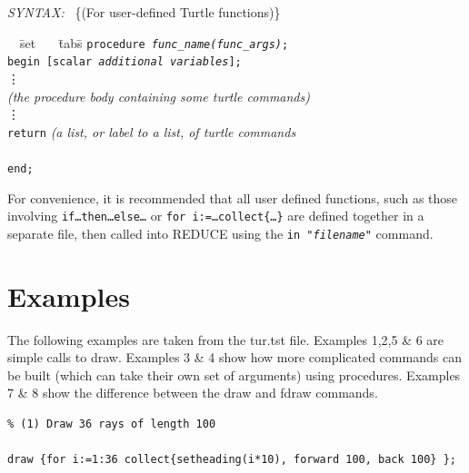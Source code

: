 \documentclass[11pt]{article}
\newcommand{\syntax}{\textsl{SYNTAX: }}
\begin{document}
\syntax\ \{\small {(For user-defined Turtle functions)}\} 
\begin{tabbing}
\ \ \= set \ \ \ \=tabs\=                                       \kill
 \> {\tt procedure {\it func\_name(func\_args)};}                  \\
 \> {\tt begin [scalar {\it additional variables}];}               \\   
 \> \> \vdots                                                      \\
 \> \> {\it (the procedure body containing some turtle commands)}  \\
 \> \> \vdots                                                      \\ 
 \> \> {\tt return} {\it (a list, or label to a list, of turtle commands}\\
 \> \>            \\
 \> {\tt end;} \\
\end{tabbing}

  For convenience, it is recommended that all user defined functions, such
as those involving {\tt if\ldots then\ldots else\ldots} or {\tt for
i:=\ldots collect\{\ldots\}} are defined together in a separate file, then
called into {\small REDUCE} using the {\tt in "{\it filename}"} command.

\newpage

\section{Examples}

The following examples are taken from the tur.tst file. 
Examples 1,2,5 \& 6 are simple calls to draw. Examples 3 \& 4 show how 
more complicated commands can be built (which can take their own set of
arguments) using procedures. Examples 7 \& 8 show the difference between
the draw and fdraw commands.

\begin{verbatim}
% (1) Draw 36 rays of length 100

draw {for i:=1:36 collect{setheading(i*10), forward 100, back 100} };
\end{verbatim}
\end{document}
